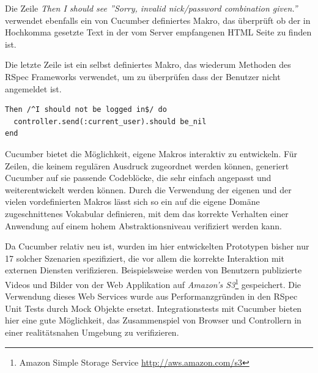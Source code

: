 Die Zeile \textit{Then I should see ''Sorry, invalid nick/password
  combination given.''} verwendet ebenfalls ein von Cucumber
definiertes Makro, das überprüft ob der in Hochkomma gesetzte Text in
der vom Server empfangenen HTML Seite zu finden ist.

Die letzte Zeile ist ein selbst definiertes Makro, das wiederum
Methoden des RSpec Frameworks verwendet, um zu überprüfen dass der
Benutzer nicht angemeldet ist.

\begin{lstlisting}
Then /^I should not be logged in$/ do
  controller.send(:current_user).should be_nil
end
\end{lstlisting}

Cucumber bietet die Möglichkeit, eigene Makros interaktiv zu
entwickeln. Für Zeilen, die keinem regulären Ausdruck zugeordnet
werden können, generiert Cucumber auf sie passende Codeblöcke, die
sehr einfach angepasst und weiterentwickelt werden können. Durch die
Verwendung der eigenen und der vielen vordefinierten Makros lässt sich
so ein auf die eigene Domäne zugeschnittenes Vokabular definieren, mit
dem das korrekte Verhalten einer Anwendung auf einem hohem
Abstraktionsniveau verifiziert werden kann.

Da Cucumber relativ neu ist, wurden im hier entwickelten Prototypen
bisher nur 17 solcher Szenarien spezifiziert, die vor allem die
korrekte Interaktion mit externen Diensten
verifizieren. Beispielsweise werden von Benutzern publizierte Videos
und Bilder von der Web Applikation auf \textit{Amazon's
  S3}\footnote{Amazon Simple Storage Service
  \url{http://aws.amazon.com/s3}} gespeichert. Die Verwendung dieses
Web Services wurde aus Performanzgründen in den RSpec Unit Tests durch
Mock Objekte ersetzt. Integrationstests mit Cucumber bieten hier eine
gute Möglichkeit, das Zusammenspiel von Browser und Controllern in
einer realitätsnahen Umgebung zu verifizieren.

